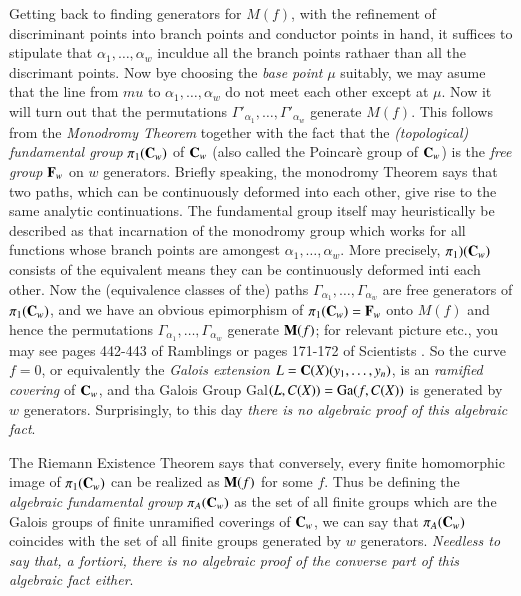  Getting back to finding generators for $M(f)$, with the refinement of discriminant points into branch points and conductor points in hand, it suffices to stipulate that $\alpha_{1}, \ldots, \alpha_{w}$ inculdue all the branch points rathaer than all the discrimant points. Now bye choosing the \textit{base point} $\mu$ suitably, we may asume that the line from $mu$ to $\alpha_{1}, \ldots, \alpha_{w}$ do not meet each other except at $\mu$.  Now it will turn out that the permutations $\Gamma'_{\alpha_{1}}, \ldots, \Gamma'_{\alpha_{w}}$ generate $M(f)$. This follows from the \textit{Monodromy Theorem} together with the fact that the \textit{(topological) fundamental group} $\pi_{1}(\mathbf{C}_{w})$ of $\mathbf{C}_{w}$ (also called the Poincar\`e group of $\mathbf{C}_{w}$) is the \textit{free group} $\mathbf{F}_{w}$ on $w$ generators. Briefly speaking, the monodromy Theorem says that two paths, which can be continuously deformed into each other, give rise to the same analytic continuations. The fundamental group itself may heuristically be described as that incarnation of the monodromy group which works for all functions whose branch points are amongest $\alpha_{1}, \ldots, \alpha_{w}$. More precisely, $\pi_{1})(\mathbf{C}_{w})$ consists of the equivalent means they can be continuously deformed inti each other. Now the (equivalence classes of the) paths $\Gamma_{\alpha_{1}}, \ldots, \Gamma_{\alpha_{w}}$ are free generators of $\pi_{1}(\mathbf{C}_{w})$, and we have an obvious epimorphism of $\pi_{1}(\mathbf{C}_{w})= \mathbf{F}_{w}$ onto $M(f)$ and hence the permutations $\Gamma_{\alpha_{1}}, \ldots, \Gamma_{\alpha_{w}}$ generate $\mathbf{M}(f)$; for relevant picture etc., you may see pages 442-443 of Ramblings \cite{chap1-key5} or pages 171-172 of Scientists \cite{chap1-key6}. So the curve $f=0$, or equivalently the \textit{Galois extension} $L=\mathbf{C}(X)(y_{1}, \ldots, y_{n})$, is an \textit{ramified covering} of $\mathbf{C}_{w}$, and tha Galois Group Gal$(L, C(X)) = {\rm Ga}(f, C(X))$ is generated by $w$ generators. Surprisingly, to this day \textit{there is no algebraic proof of this algebraic fact}.

The Riemann Existence Theorem says that conversely, every finite homomorphic image of $\pi_{1}(\mathbf{C}_{w})$ can be realized as $\mathbf{M}(f)$ for some $f$. Thus be defining the \textit{algebraic fundamental growp} $\pi_{A}(\mathbf{C}_{w})$ as the set of all finite groups which are the Galois groups of finite unramified coverings of $\mathbf{C}_{w}$, we can say that $\pi_{A}(\mathbf{C}_{w})$ coincides with the set of all  finite groups generated by $w$ generators. \textit{Needless to say that, a fortiori, there is no algebraic proof of the converse part of this algebraic fact either}.

